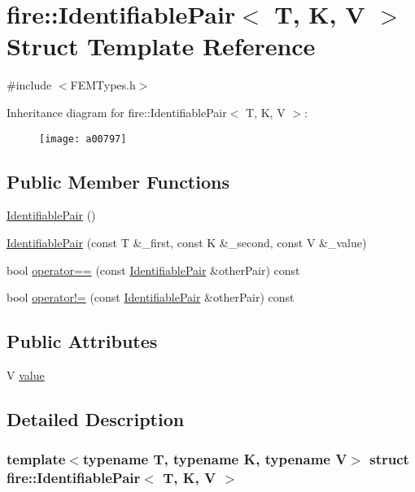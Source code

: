 \hypertarget{a00797}{}\section{fire\+:\+:Identifiable\+Pair$<$ T, K, V $>$ Struct Template Reference}
\label{a00797}


{\ttfamily \#include $<$F\+E\+M\+Types.\+h$>$}

Inheritance diagram for fire\+:\+:Identifiable\+Pair$<$ T, K, V $>$\+:\begin{figure}[H]
\begin{center}
\leavevmode
\texttt{[image: a00797]}
\end{center}
\end{figure}
\subsection*{Public Member Functions}
\begin{DoxyCompactItemize}
\item 
\hyperlink{a00797_a00a1d2e1fc20b2edf8e27dc3158d8826}{Identifiable\+Pair} ()
\item 
\hyperlink{a00797_ade6ddca350a2128a5cab071118c26fee}{Identifiable\+Pair} (const T \&\+\_\+first, const K \&\+\_\+second, const V \&\+\_\+value)
\item 
bool \hyperlink{a00797_a668b15329da55ba90a0232077f7c069c}{operator==} (const \hyperlink{a00797}{Identifiable\+Pair} \&other\+Pair) const
\item 
bool \hyperlink{a00797_ac6a86b2992ee7fa5f868077a73d2667f}{operator!=} (const \hyperlink{a00797}{Identifiable\+Pair} \&other\+Pair) const
\end{DoxyCompactItemize}
\subsection*{Public Attributes}
\begin{DoxyCompactItemize}
\item 
V \hyperlink{a00797_a4aa238990585cb35d1902140ebe6fb9f}{value}
\end{DoxyCompactItemize}


\subsection{Detailed Description}
\subsubsection*{template$<$typename T, typename K, typename V$>$\newline
struct fire\+::\+Identifiable\+Pair$<$ T, K, V $>$}

